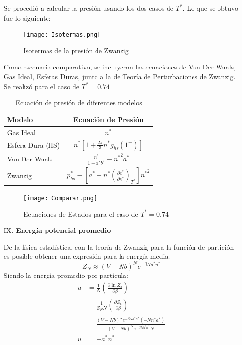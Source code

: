 \documentclass[12pt,letterpaper]{article}
\newcommand{\pd}[3] {\left(\frac{\partial #1}{\partial #2}\right)_{#3}}
\begin{document}
\begin{enumerate}
Se procedió a calcular la presión usando los dos casos de $T^*$. Lo que se obtuvo fue lo siguiente:
\begin{figure}[H]
	\centering
	\texttt{[image: Isotermas.png]}
	\caption{Isotermas de la presión de Zwanzig}
\end{figure}
Como escenario comparativo, se incluyeron las ecuaciones de Van Der Waals, Gas Ideal, Esferas Duras, junto a la de Teoría de Perturbaciones de Zwanzig. Se realizó para el caso de $T^*=0.74$
\begin{table}[H]
\centering
\begin{tabular}{|l|c|}
\hline 
Modelo & Ecuación de Presión \\ \hline 
Gas Ideal & $n^*$ \\ \hline 
Esfera Dura (HS) & $n^* \left[  1+\frac{2\pi}{3} n^* g_{hs}(1^+) \right] $\\ \hline 
Van Der Waals &  $\frac{n^*}{1-n^*b^*} - {n^*}^2a^*$ \\ \hline 
Zwanzig & $ p^*_{hs} - \left[ a^* + n^* \left(\frac{\partial a^*}{\partial n^*}\right)_{T^*} \right] {n^*}^2 $ \\ \hline 
\end{tabular} 
\caption{Ecuación de presión de diferentes modelos}
\end{table}
\begin{figure}[H]
	\centering 
	\texttt{[image: Comparar.png]}
	\caption{Ecuaciones de Estados para el caso de $T^*=0.74$}
	\label{Fig:EcEst_Compara}
\end{figure}

\item[IX.]\textbf{Energía potencial promedio}

De la física estadística, con la teoría de Zwanzig para la función de partición es posible obtener una expresión para la energía media.
\begin{equation}
	Z_N \approx \left( V-Nb\right)^N e^{-\beta N a^*n^*}
\end{equation}
Siendo la energía promedio por partícula:
\begin{align}
	\overline{u} &= \frac{1}{N} \pd{\ln Z_n}{\beta}{} \nonumber\\
	&= \frac{1}{Z_N N} \pd{Z_n}{\beta}{} \nonumber \\
	&= \frac{ \left( V-Nb\right)^N e^{-\beta N a^*n^*} \left(-Nn^*a^*\right)  }{\left( V-Nb\right)^N e^{-\beta N a^*n^*} N}  \nonumber \\
	\overline{u} &= -a^*n^*
\end{align}
	






\end{enumerate}

\pagebreak






\end{document}
